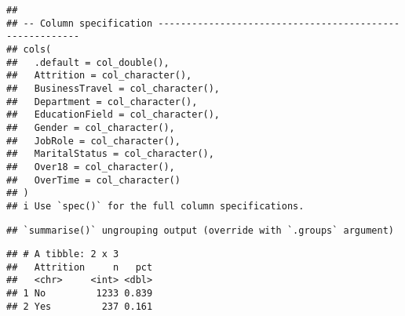 \documentclass[
]{article}
\newenvironment{Shaded}{\begin{snugshade}}{\end{snugshade}}
\newcommand{\CommentTok}[1]{\textcolor[rgb]{0.56,0.35,0.01}{\textit{#1}}}
\newcommand{\DataTypeTok}[1]{\textcolor[rgb]{0.13,0.29,0.53}{#1}}
\newcommand{\KeywordTok}[1]{\textcolor[rgb]{0.13,0.29,0.53}{\textbf{#1}}}
\newcommand{\NormalTok}[1]{#1}
\newcommand{\OperatorTok}[1]{\textcolor[rgb]{0.81,0.36,0.00}{\textbf{#1}}}
\newcommand{\StringTok}[1]{\textcolor[rgb]{0.31,0.60,0.02}{#1}}
\begin{document}
\begin{verbatim}
## 
## -- Column specification --------------------------------------------------------
## cols(
##   .default = col_double(),
##   Attrition = col_character(),
##   BusinessTravel = col_character(),
##   Department = col_character(),
##   EducationField = col_character(),
##   Gender = col_character(),
##   JobRole = col_character(),
##   MaritalStatus = col_character(),
##   Over18 = col_character(),
##   OverTime = col_character()
## )
## i Use `spec()` for the full column specifications.
\end{verbatim}

\begin{Shaded}
\end{Shaded}

\begin{verbatim}
## `summarise()` ungrouping output (override with `.groups` argument)
\end{verbatim}

\begin{verbatim}
## # A tibble: 2 x 3
##   Attrition     n   pct
##   <chr>     <int> <dbl>
## 1 No         1233 0.839
## 2 Yes         237 0.161
\end{verbatim}

\begin{Shaded}
\end{Shaded}
\end{document}
